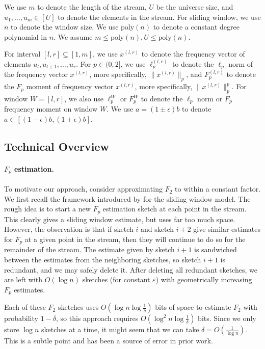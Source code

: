 \documentclass{article}
\newcommand{\eps}{\varepsilon}
\theoremstyle{plain}
\begin{document}
We use $m$ to denote the length of the stream, $U$ be the universe size, and $u_1, \dots, u_m \in [U]$ to denote the elements in the stream. For sliding window, we use $n$ to denote the window size. We use $\text{poly}(n)$ to denote a constant degree polynomial in $n$. We assume $m \le \text{poly}(n), U \le \text{poly}(n)$. 

For interval $[l, r] \subseteq [1, m]$, we use $x ^ {(l,r)}$ to denote the frequency vector of elements $u_l, u_{l+1}, \dots, u_r$. For $p \in (0, 2]$, we use $\ell_p ^ {(l,r)}$ to denote the $\ell_p$ norm of the frequency vector $x ^ {(l,r)}$, more specifically, $\|x ^ {(l, r)}\|_p$, and $F_p ^ {(l,r)}$ to denote the $F_p$ moment of frequency vector $x ^ {(l,r)}$, more specifically, $\|x ^ {(l, r)}\|_p ^ p$. For window $W = [l, r]$, we also use $\ell_p ^ W$ or $F_p ^ W$ to denote the $\ell_p$ norm or $F_p$ frequency moment on window $W$. We use $a = (1 \pm \epsilon) b$ to denote $a \in [(1 - \epsilon)b, (1 + \epsilon)b]$.
 
\subsection{Technical Overview}

\paragraph{$F_p$ estimation.} 

To motivate our approach, consider approximating $F_2$ to within a constant factor. We first recall the framework introduced by \cite{braverman2007smooth} for the sliding window model.   The rough idea is to start a new $F_p$ estimation sketch at each point in the stream.  This clearly gives a sliding window estimate, but uses far too much space.  However, the observation is that if sketch $i$ and sketch $i+2$ give similar estimates for $F_p$ at a given point in the stream, then they will continue to do so for the remainder of the stream.  The estimate given by sketch $i+1$ is sandwiched between the estimates from the neighboring sketches, so sketch $i+1$ is redundant, and we may safely delete it.  After deleting all redundant sketches, we are left with $O(\log n)$ sketches (for constant $\eps$) with geometrically increasing $F_p$ estimates.

Each of these $F_2$ sketches uses $O(\log n \log\frac{1}{\delta})$ bits of space to estimate $F_2$ with probability $1-\delta$, so this approach requires $O(\log^2 n \log \frac{1}{\delta})$ bits.  Since we only store $\log n$ sketches at a time, it might seem that we can take $\delta = O(\frac{1}{\log n}).$  This is a subtle point and has been a source of error in prior work.
\end{document}
